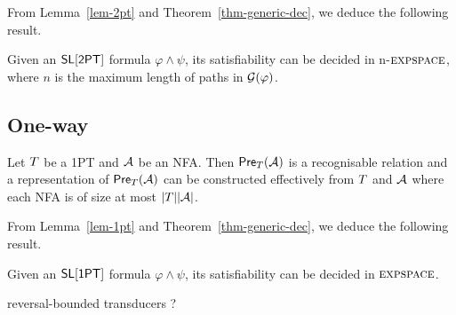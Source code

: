From Lemma~\ref{lem-2pt} and Theorem~\ref{thm-generic-dec}, we deduce the following result.
%
\begin{corollary}
Given an $\textsf{SL}[\textsf{2PT}]$ formula $\varphi \wedge \psi$, its satisfiability can be decided in n-$\textsc{expspace}$, where $n$ is the maximum length of paths in $\mathcal{G}(\varphi)$. 
\end{corollary}


\subsection{One-way}


\begin{lemma}\label{lem-1pt}
Let $T$ be a 1PT and $\mathcal{A}$ be an NFA. Then $\textsf{Pre}_{T}(\mathcal{A})$ is a recognisable relation and a representation of $\textsf{Pre}_{T}(\mathcal{A})$ can be constructed effectively from $T$ and $\mathcal{A}$ where each NFA is of size at most $|T||\mathcal{A}|$.
\end{lemma}

From Lemma~\ref{lem-1pt} and Theorem~\ref{thm-generic-dec}, we deduce the following result.
%
\begin{corollary}
Given an $\textsf{SL}[\textsf{1PT}]$ formula $\varphi \wedge \psi$, its satisfiability can be decided in $\textsc{expspace}$. 
\end{corollary}

reversal-bounded transducers ?

